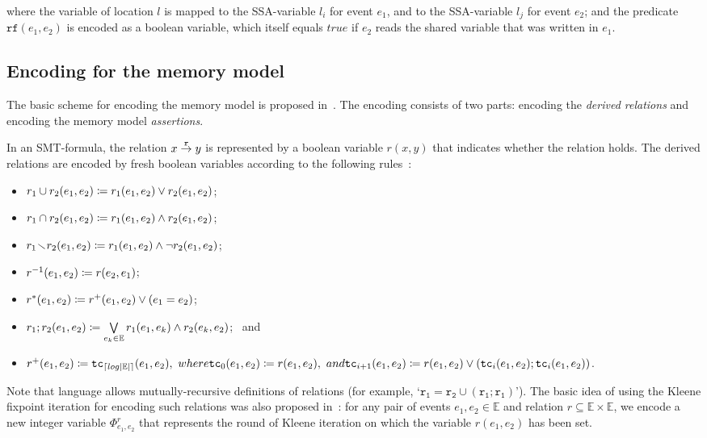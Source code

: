 where the variable of location $l$ is mapped to the SSA-variable $l_i$ for event $e_1$, and to the SSA-variable $l_j$ for event $e_2$; and the predicate $\texttt{rf}(e_1, e_2)$ is encoded as a boolean variable, which itself equals $true$ if $e_2$ reads the shared variable that was written in $e_1$.


\subsection{Encoding for the memory model} %
\label{ch:enc:enc:wmm}

The basic scheme for encoding the memory model is proposed in~\cite{Porthos17a}.
The encoding consists of two parts: encoding the \textit{derived relations} and encoding the memory model \textit{assertions}.

In an SMT-formula, the relation $x \overset{\texttt{r}}{\rightarrow} y$ is represented by a boolean variable $r(x, y)$ that indicates whether the relation holds.
The derived relations are encoded by fresh boolean variables according to the following rules~\cite{Porthos17b}:
\begin{itemize}[noitemsep,topsep=0pt]
\item $r_1 \cup r_2(e_1, e_2) \coloneqq r_1(e_1, e_2) \lor r_2(e_1, e_2)$;
\item $r_1 \cap r_2(e_1, e_2) \coloneqq r_1(e_1, e_2) \land r_2(e_1, e_2)$;
\item $r_1 \!\smallsetminus\! r_2(e_1, e_2) \coloneqq r_1(e_1, e_2) \land \neg r_2(e_1, e_2)$;
\item $r^{-1}(e_1, e_2) \coloneqq r(e_2, e_1)$;
\item $r^{*}(e_1, e_2) \coloneqq r^{+}(e_1, e_2) \lor (e_1 = e_2)$;
\item $r_1;r_2(e_1,e_2) \coloneqq \bigvee\limits_{e_k \in \mathbb{E}}^{} r_1(e_1,e_k) \land r_2(e_k,e_2)$; \ and
\item $r^{+}(e_1, e_2) \defeq \texttt{tc}_{\left\lceil log|\mathbb{E}| \right\rceil} (e_1, e_2), \ where \vspace{0.25em} \\
\texttt{tc}_{0}(e_1,e_2) \defeq r(e_1,e_2), \ and \\
\texttt{tc}_{i+1}(e_1,e_2) \defeq r(e_1,e_2) \lor (\texttt{tc}_{i}(e_1,e_2);\texttt{tc}_{i}(e_1,e_2))$.
\end{itemize}
\vspace{1em}

Note that \cat{} language allows mutually-recursive definitions of relations (for example, `$\texttt{r}_\texttt{1} = \texttt{r}_\texttt{2} \cup (\texttt{r}_\texttt{1}; \texttt{r}_\texttt{1})$').
The basic idea of using the Kleene fixpoint iteration for encoding such relations was also proposed in~\cite{Porthos17a}: for any pair of events $e_1,e_2 \in \mathbb{E}$ and relation $r \subseteq \mathbb{E} \times \mathbb{E}$, we encode a new integer variable $\Phi_{e_1,e_2}^{r}$ that represents the round of Kleene iteration on which the variable $r(e_1, e_2)$ has been set.

